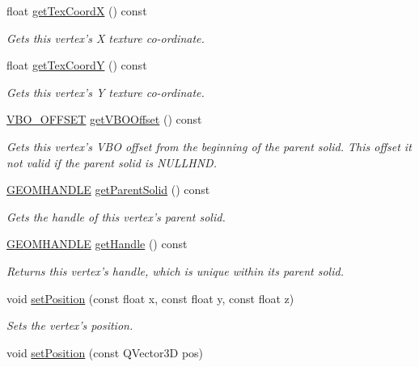 \begin{DoxyCompactItemize}
float \hyperlink{class_vertex3_d_ad22bd676ad371c1a3ba6e987e0704733}{get\-Tex\-Coord\-X} () const 
\begin{DoxyCompactList}\small\item\em Gets this vertex's X texture co-\/ordinate. \end{DoxyCompactList}\item 
float \hyperlink{class_vertex3_d_a3b6eab91dea0d4eb0c53d6c414bda232}{get\-Tex\-Coord\-Y} () const 
\begin{DoxyCompactList}\small\item\em Gets this vertex's Y texture co-\/ordinate. \end{DoxyCompactList}\item 
\hyperlink{vertex_8h_a2e2e1374aac5842116c8683f3b06e99f}{V\-B\-O\-\_\-\-O\-F\-F\-S\-E\-T} \hyperlink{class_vertex3_d_a04dca81ead78614468f7028913a2a582}{get\-V\-B\-O\-Offset} () const 
\begin{DoxyCompactList}\small\item\em Gets this vertex's V\-B\-O offset from the beginning of the parent solid. This offset it not valid if the parent solid is N\-U\-L\-L\-H\-N\-D. \end{DoxyCompactList}\item 
\hyperlink{vertex_8h_a72202e57358ed73cd212e9a2eaf39aeb}{G\-E\-O\-M\-H\-A\-N\-D\-L\-E} \hyperlink{class_vertex3_d_a77b0e7b96b5ec626d56ea32963111c37}{get\-Parent\-Solid} () const 
\begin{DoxyCompactList}\small\item\em Gets the handle of this vertex's parent solid. \end{DoxyCompactList}\item 
\hyperlink{vertex_8h_a72202e57358ed73cd212e9a2eaf39aeb}{G\-E\-O\-M\-H\-A\-N\-D\-L\-E} \hyperlink{class_vertex3_d_acd4bdbddebb5090650cd31883280175e}{get\-Handle} () const 
\begin{DoxyCompactList}\small\item\em Returns this vertex's handle, which is unique within its parent solid. \end{DoxyCompactList}\item 
void \hyperlink{class_vertex3_d_a0727071117d99f6a5f5227b54d41a7cf}{set\-Position} (const float x, const float y, const float z)
\begin{DoxyCompactList}\small\item\em Sets the vertex's position. \end{DoxyCompactList}\item 
void \hyperlink{class_vertex3_d_a62274f5655891dc5dfe979bc2c57ded6}{set\-Position} (const Q\-Vector3\-D pos)

\end{DoxyCompactItemize}
